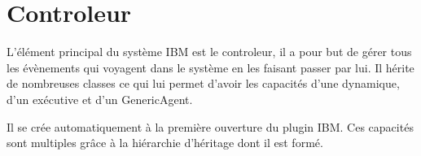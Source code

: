 \section{Controleur}
L'élément principal du système IBM est le controleur, il a pour but de gérer tous les évènements qui voyagent dans le système en les faisant passer par lui. Il hérite de nombreuses classes ce qui lui permet d'avoir les capacités d'une dynamique, d'un exécutive et d'un GenericAgent.\\
\noindent\begin{minipage}{\linewidth}%
\end{minipage}

Il se crée automatiquement à la première ouverture du plugin IBM. Ces capacités sont multiples grâce à la hiérarchie d'héritage dont il est formé.
